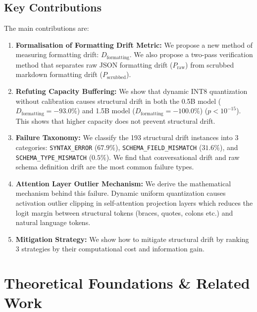 \documentclass[10pt,journal,compsoc]{IEEEtran}
\newcommand{\errSyn}{\texttt{SYNTAX\_\allowbreak ERROR}}
\newcommand{\errField}{\texttt{SCHEMA\_\allowbreak FIELD\_\allowbreak MISMATCH}}
\newcommand{\errType}{\texttt{SCHEMA\_\allowbreak TYPE\_\allowbreak MISMATCH}}
\begin{document}
\subsection{Key Contributions}
The main contributions are:
\begin{enumerate}
\item \textbf{ Formalisation of Formatting Drift Metric: } We propose a new method of measuring formatting drift: $D_{\text{formatting}}$. We also propose a two-pass verification method that separates raw JSON formatting drift ($P_{\text{raw}}$) from scrubbed markdown formatting drift ($P_{\text{scrubbed}}$).
\item \textbf{ Refuting Capacity Buffering: } We show that dynamic INT8 quantization without calibration causes structural drift in both the 0.5B model ($D_{\text{formatting}} = -93.0\%$) and 1.5B model ($D_{\text{formatting}} = -100.0\%$) ($p < 10^{-15}$). This shows that higher capacity does not prevent structural drift.
\item \textbf{ Failure Taxonomy: } We classify the 193 structural drift instances into 3 categories: \errSyn{} ($67.9\%$), \errField{} ($31.6\%$), and \errType{} ($0.5\%$). We find that conversational drift and raw schema definition drift are the most common failure types.
\item \textbf{ Attention Layer Outlier Mechanism: } We derive the mathematical mechanism behind this failure. Dynamic uniform quantization causes activation outlier clipping in self-attention projection layers which reduces the logit margin between structural tokens (braces, quotes, colons etc.) and natural language tokens.
\item \textbf{ Mitigation Strategy: } We show how to mitigate structural drift by ranking 3 strategies by their computational cost and information gain.
\end{enumerate}

\section{Theoretical Foundations \& Related Work}
\end{document}

